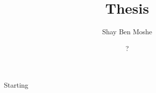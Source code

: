 \documentclass{article}
\title{Thesis}
\author{Shay Ben Moshe}
\date{?}
\theoremstyle{definition}
\theoremstyle{remark}
\begin{document}
	\maketitle
	
	Starting
\end{document}
